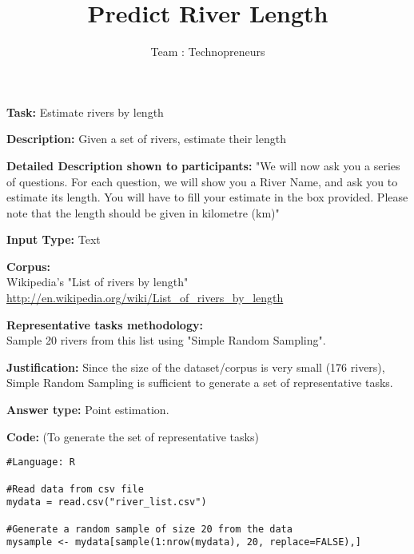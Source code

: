 \documentclass[12pt]{article}
\title{\textbf{Predict River Length} \vspace{-2ex}}
\author{Team : Technopreneurs}
\date{\vspace{-5ex}}
\begin{document}
\maketitle

\begin{flushleft}
\textbf{Task:} Estimate rivers by length \par
\textbf{Description:} Given a set of rivers, estimate their length \par
\textbf{Detailed Description shown to participants:} "We will now ask you a series of questions. For each question, we will show you a River Name, and ask you to estimate its length. You will have to fill your estimate in the box provided. Please note that the length should be given in kilometre (km)" \par
\textbf{Input Type:} Text \par
\textbf{Corpus: }\\
Wikipedia's "List of rivers by length"\\
\url{http://en.wikipedia.org/wiki/List_of_rivers_by_length} \par

\textbf{Representative tasks methodology:} \\
Sample 20 rivers from this list using "Simple Random Sampling". \par

\textbf{Justification:} Since the size of the dataset/corpus is very small (176 rivers), Simple Random Sampling is sufficient to generate a set of representative tasks. \par
\textbf{Answer type:} Point estimation.	\par

\textbf{Code:} (To generate the set of representative tasks)
\lstset{language=R}
\begin{lstlisting}[frame=single]  
#Language: R

#Read data from csv file
mydata = read.csv("river_list.csv")

#Generate a random sample of size 20 from the data
mysample <- mydata[sample(1:nrow(mydata), 20, replace=FALSE),] 
\end{lstlisting}

\end{flushleft}
\end{document}
